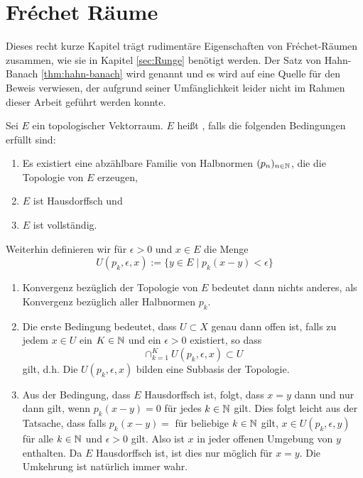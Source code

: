 
\section{Fr\'echet Räume}
\label{sec:frechet}

Dieses recht kurze Kapitel trägt rudimentäre Eigenschaften von
Fr\'echet-Räumen zusammen, wie sie in Kapitel \ref{sec:Runge} benötigt
werden. Der Satz von Hahn-Banach \ref{thm:hahn-banach} wird genannt
und es wird auf eine Quelle für den Beweis verwiesen, der aufgrund
seiner Umfänglichkeit leider nicht im Rahmen dieser Arbeit geführt
werden konnte.

\begin{defin}
  \label{def:frechet}
  Sei $E$ ein topologischer Vektorraum. $E$ heißt
  , falls die folgenden Bedingungen erfüllt sind:
  \begin{enumerate}
  \item Es existiert eine abzählbare Familie von Halbnormen $(p_n)_{n
      \in \mathbb{N}}$, die die Topologie von $E$ erzeugen,
  \item $E$ ist Hausdorffsch und
  \item $E$ ist vollständig.
  \end{enumerate}
  Weiterhin definieren wir für $\epsilon > 0$ und $x \in E$ die Menge
  \[
  U(p_k, \epsilon, x) := \{ y \in E \mid p_k(x-y) < \epsilon\}
  \]
\end{defin}


\begin{rem}
  \label{rem:frechet}
  \begin{enumerate}
  \item Konvergenz bezüglich der Topologie von $E$ bedeutet dann
    nichts anderes, als Konvergenz bezüglich aller Halbnormen $p_k$.
  \item Die erste Bedingung bedeutet, dass $U\subset X$ genau dann
    offen ist, falls zu jedem $x \in U$ ein $K \in \mathbb{N}$ und ein
    $\epsilon > 0$ existiert, so dass
    \[
    \cap_{k=1}^K U(p_k, \epsilon, x) \subset U
    \]
    gilt, d.h. Die $U(p_k, \epsilon, x)$ bilden eine Subbasis der Topologie.
  \item Aus der Bedingung, dass $E$ Hausdorffsch ist, folgt, dass $x =
    y$ dann und nur dann gilt, wenn $p_k(x-y) = 0$ für jedes $k \in
    \mathbb{N}$ gilt. Dies folgt leicht aus der Tatsache, dass falls $p_k(x-y)
    = $ für beliebige $k \in \mathbb{N}$ gilt, $x \in U(p_k, \epsilon, y)$ für
    alle $k \in \mathbb{N}$ und $\epsilon > 0$ gilt. Also ist $x$ in jeder
    offenen Umgebung von $y$ enthalten. Da $E$ Hausdorffsch ist, ist
    dies nur möglich für $x = y$. Die Umkehrung ist natürlich immer wahr.
  \end{enumerate}
\end{rem}

